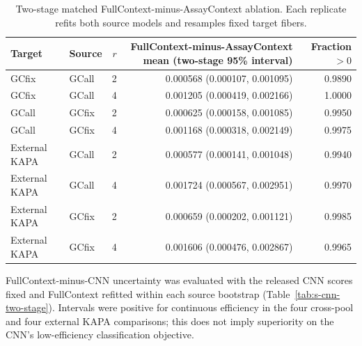 \documentclass[10pt]{article}
\begin{document}
\begin{table}[H]
\centering
\small
\begin{tabular}{llrrr}
\toprule
Target & Source & $r$ & FullContext-minus-AssayContext mean (two-stage 95\% interval) & Fraction $>0$ \\
\midrule
GCfix & GCall & 2 & 0.000568 (0.000107, 0.001095) & 0.9890 \\
GCfix & GCall & 4 & 0.001205 (0.000419, 0.002166) & 1.0000 \\
GCall & GCfix & 2 & 0.000625 (0.000158, 0.001085) & 0.9950 \\
GCall & GCfix & 4 & 0.001168 (0.000318, 0.002149) & 0.9975 \\
External KAPA & GCall & 2 & 0.000577 (0.000141, 0.001048) & 0.9940 \\
External KAPA & GCall & 4 & 0.001724 (0.000567, 0.002951) & 0.9970 \\
External KAPA & GCfix & 2 & 0.000659 (0.000202, 0.001121) & 0.9985 \\
External KAPA & GCfix & 4 & 0.001606 (0.000476, 0.002867) & 0.9965 \\
\bottomrule
\end{tabular}
\caption{Two-stage matched FullContext-minus-AssayContext ablation. Each replicate refits both source models and resamples fixed target fibers.}
\label{tab:s-ablation}
\end{table}

FullContext-minus-CNN uncertainty was evaluated with the released CNN scores fixed and FullContext refitted within each source bootstrap (Table~\ref{tab:s-cnn-two-stage}). Intervals were positive for continuous efficiency in the four cross-pool and four external KAPA comparisons; this does not imply superiority on the CNN's low-efficiency classification objective.
\end{document}
